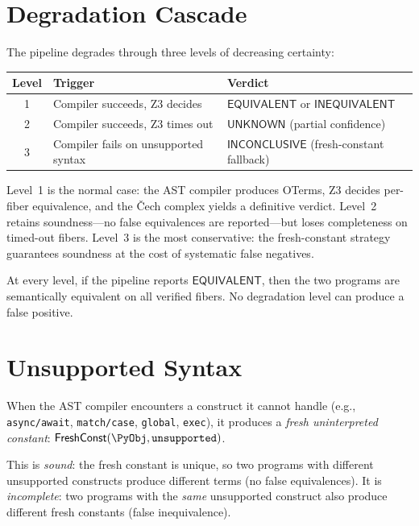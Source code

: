 \section{Degradation Cascade}

The pipeline degrades through three levels of decreasing certainty:

\begin{center}
\begin{tabular}{c l l}
  \textbf{Level} & \textbf{Trigger} & \textbf{Verdict} \\
  \hline
  1 & Compiler succeeds, Z3 decides &
      $\mathsf{EQUIVALENT}$ or $\mathsf{INEQUIVALENT}$ \\
  2 & Compiler succeeds, Z3 times out &
      $\mathsf{UNKNOWN}$ (partial confidence) \\
  3 & Compiler fails on unsupported syntax &
      $\mathsf{INCONCLUSIVE}$ (fresh-constant fallback) \\
\end{tabular}
\end{center}

\noindent
Level~1 is the normal case: the AST compiler produces OTerms, Z3
decides per-fiber equivalence, and the \v{C}ech complex yields a
definitive verdict.  Level~2 retains soundness---no false
equivalences are reported---but loses completeness on timed-out
fibers.  Level~3 is the most conservative: the fresh-constant
strategy guarantees soundness at the cost of systematic false
negatives.

\begin{proposition}
At every level, if the pipeline reports $\mathsf{EQUIVALENT}$,
then the two programs are semantically equivalent on all verified
fibers.  No degradation level can produce a false positive.
\end{proposition}

\section{Unsupported Syntax}

When the AST compiler encounters a construct it cannot handle
(e.g., \texttt{async/await}, \texttt{match/case}, \texttt{global},
\texttt{exec}), it produces a \emph{fresh uninterpreted constant}:
$\mathsf{FreshConst}(\PyObj, \texttt{unsupported})$.

This is \emph{sound}: the fresh constant is unique, so two programs
with different unsupported constructs produce different terms (no
false equivalences).  It is \emph{incomplete}: two programs with the
\emph{same} unsupported construct also produce different fresh
constants (false inequivalence).

